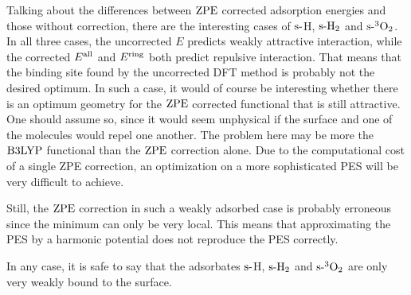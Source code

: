 \documentclass[8.5pt,twoside,twocolumn]{article}
\newcommand\zpe{\enmat{\te{ZPE}}}
\newcommand\ering{\enmat{E^{\te{ring}}}}
\newcommand\eall{\enmat{E^{\te{all}}}}
\newcommand\sur{\enmat{\te{s-}}}
\newcommand\tripot{\enmat{{^3\ot}}}
\theoremstyle{standard}
\begin{document}
Talking about the differences between $\zpe$ corrected adsorption energies
and those without correction, there are the interesting cases of 
$\sur$H, $\sur\htw$ and $\sur\tripot$. In all three cases, the uncorrected
$E$ predicts weakly attractive interaction, while the corrected $\eall$
and $\ering$ both predict repulsive interaction. That means that
the binding site found by the uncorrected DFT method is probably not the
desired optimum.
In such a case, it would of
course be interesting whether there is an optimum geometry for the $\zpe$
corrected functional that is still attractive. One should assume so,
since it would seem unphysical if the surface and one of the
molecules would repel one another. The problem here may be more the
$\text{B3LYP}$ functional than the $\zpe$ correction alone. Due to the computational
cost of a single ZPE correction, an optimization on a more sophisticated 
PES will be very difficult to achieve.

Still, the $\zpe$ correction in such a weakly adsorbed case is probably
erroneous since the minimum can only be very local. This means that
approximating the PES by a harmonic potential does not reproduce the PES
correctly.

In any case, it is safe to say that the adsorbates $\sur$H, $\sur\htw$ and $\sur\tripot$
are only very weakly bound to the surface.

\end{document}
